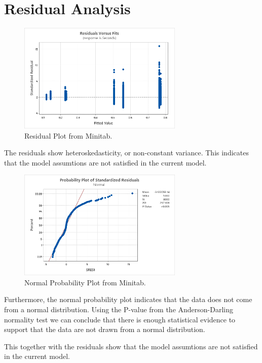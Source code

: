 \documentclass{article}
\begin{document}
\section{Residual Analysis}
\begin{figure}[h] %
  \centering
  \includegraphics[width=0.7\textwidth]{./images/residuals.png}
  \caption{Residual Plot from Minitab.}
  \label{fig:interaction}
\end{figure}
The residuals show heteroskedasticity, or non-constant variance.
This indicates that the model assumtions are not satisfied in the current model. \\

\begin{figure}[h] %
  \centering
  \includegraphics[width=0.7\textwidth]{./images/normal.png}
  \caption{Normal Probability Plot from Minitab.}
  \label{fig:interaction}
\end{figure}

Furthermore, the normal probability plot indicates that the data does not come from a normal distribution.
Using the P-value from the Anderson-Darling normality test we can conclude that there is enough statistical evidence to support that the data are not drawn from a normal distribution.

This together with the residuals show that the model assumtions are not satisfied in the current model.
\end{document}
